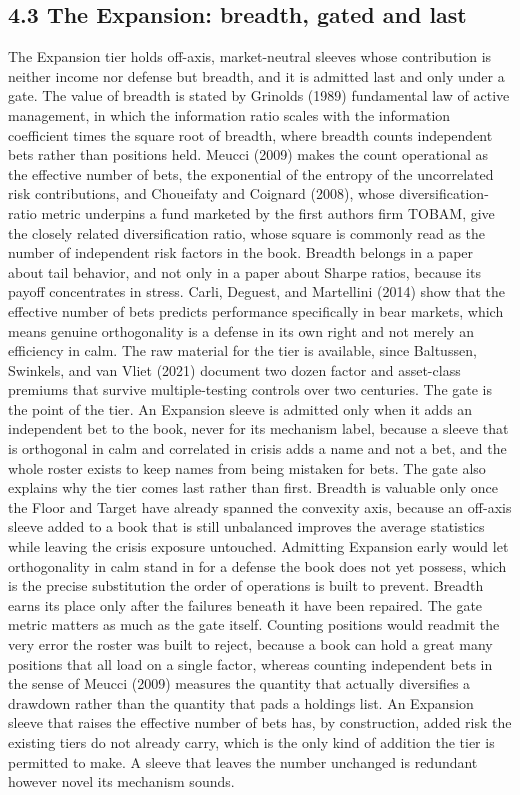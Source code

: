 \documentclass[12pt, a4paper]{article}
\begin{document}
\subsection*{4.3 The Expansion: breadth, gated and
last}\label{the-expansion-breadth-gated-and-last}

The Expansion tier holds off-axis, market-neutral sleeves whose
contribution is neither income nor defense but breadth, and it is
admitted last and only under a gate. The value of breadth is stated by
Grinold\textquotesingle s (1989) fundamental law of active management,
in which the information ratio scales with the information coefficient
times the square root of breadth, where breadth counts independent bets
rather than positions held. Meucci (2009) makes the count operational as
the effective number of bets, the exponential of the entropy of the
uncorrelated risk contributions, and Choueifaty and Coignard (2008),
whose diversification-ratio metric underpins a fund marketed by the
first author\textquotesingle s firm TOBAM, give the closely related
diversification ratio, whose square is commonly read as the number of
independent risk factors in the book. Breadth belongs in a paper about
tail behavior, and not only in a paper about Sharpe ratios, because its
payoff concentrates in stress. Carli, Deguest, and Martellini (2014)
show that the effective number of bets predicts performance specifically
in bear markets, which means genuine orthogonality is a defense in its
own right and not merely an efficiency in calm. The raw material for the
tier is available, since Baltussen, Swinkels, and van Vliet (2021)
document two dozen factor and asset-class premiums that survive
multiple-testing controls over two centuries. The gate is the point of
the tier. An Expansion sleeve is admitted only when it adds an
independent bet to the book, never for its mechanism label, because a
sleeve that is orthogonal in calm and correlated in crisis adds a name
and not a bet, and the whole roster exists to keep names from being
mistaken for bets. The gate also explains why the tier comes last rather
than first. Breadth is valuable only once the Floor and Target have
already spanned the convexity axis, because an off-axis sleeve added to
a book that is still unbalanced improves the average statistics while
leaving the crisis exposure untouched. Admitting Expansion early would
let orthogonality in calm stand in for a defense the book does not yet
possess, which is the precise substitution the order of operations is
built to prevent. Breadth earns its place only after the failures
beneath it have been repaired. The gate metric matters as much as the
gate itself. Counting positions would readmit the very error the roster
was built to reject, because a book can hold a great many positions that
all load on a single factor, whereas counting independent bets in the
sense of Meucci (2009) measures the quantity that actually diversifies a
drawdown rather than the quantity that pads a holdings list. An
Expansion sleeve that raises the effective number of bets has, by
construction, added risk the existing tiers do not already carry, which
is the only kind of addition the tier is permitted to make. A sleeve
that leaves the number unchanged is redundant however novel its
mechanism sounds.
\end{document}
